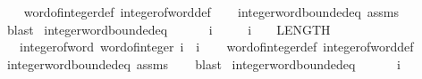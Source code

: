 \begin{isabellebody}
%
\isadelimproof
\ \ %
\endisadelimproof
%
\isatagproof
{}\isamarkupfalse%
\ word{}{}{\isacharunderscore}{\kern0pt}of{\isacharunderscore}{\kern0pt}integer{\isacharunderscore}{\kern0pt}def\ integer{\isacharunderscore}{\kern0pt}of{\isacharunderscore}{\kern0pt}word{}{}{\isacharunderscore}{\kern0pt}def\isanewline
\ \ \isamarkupfalse%
\ integer{\isacharunderscore}{\kern0pt}word{\isacharunderscore}{\kern0pt}bounded{\isacharunderscore}{\kern0pt}eq\ assms\isanewline
\ \ \isamarkupfalse%
\ blast%
\endisatagproof
{\isafoldproof}%
%
\isadelimproof
\isanewline
%
\endisadelimproof
\isanewline
{}\isamarkupfalse%
\ integer{\isacharunderscore}{\kern0pt}word{}{}{\isacharunderscore}{\kern0pt}bounded{\isacharunderscore}{\kern0pt}eq{\isacharcolon}{\kern0pt}\isanewline
\ \ \ \ {\isachardoublequoteopen}{}\ {\isasymle}\ i{\isachardoublequoteclose}\isanewline
\ \ \ \ \ {\isachardoublequoteopen}i\ {\isasymle}\ {}\ {\isacharcircum}{\kern0pt}\ LENGTH{\isacharparenleft}{\kern0pt}{}{}{\isacharparenright}{\kern0pt}\ {\isacharminus}{\kern0pt}\ {}{\isachardoublequoteclose}\isanewline
\ \ \ {\isachardoublequoteopen}integer{\isacharunderscore}{\kern0pt}of{\isacharunderscore}{\kern0pt}word{}{}\ {\isacharparenleft}{\kern0pt}word{}{}{\isacharunderscore}{\kern0pt}of{\isacharunderscore}{\kern0pt}integer\ i{\isacharparenright}{\kern0pt}\ {\isacharequal}{\kern0pt}\ i{\isachardoublequoteclose}\isanewline
%
\isadelimproof
\ \ %
\endisadelimproof
%
\isatagproof
{}\isamarkupfalse%
\ word{}{}{\isacharunderscore}{\kern0pt}of{\isacharunderscore}{\kern0pt}integer{\isacharunderscore}{\kern0pt}def\ integer{\isacharunderscore}{\kern0pt}of{\isacharunderscore}{\kern0pt}word{}{}{\isacharunderscore}{\kern0pt}def\isanewline
\ \ \isamarkupfalse%
\ integer{\isacharunderscore}{\kern0pt}word{\isacharunderscore}{\kern0pt}bounded{\isacharunderscore}{\kern0pt}eq\ assms\isanewline
\ \ \isamarkupfalse%
\ blast%
\endisatagproof
{\isafoldproof}%
%
\isadelimproof
\isanewline
%
\endisadelimproof
\isanewline
{}\isamarkupfalse%
\ integer{\isacharunderscore}{\kern0pt}word{}{}{\isacharunderscore}{\kern0pt}bounded{\isacharunderscore}{\kern0pt}eq{\isacharcolon}{\kern0pt}\isanewline
\ \ \ \ {\isachardoublequoteopen}{}\ {\isasymle}\ i{\isachardoublequoteclose}\isanewline

\end{isabellebody}
